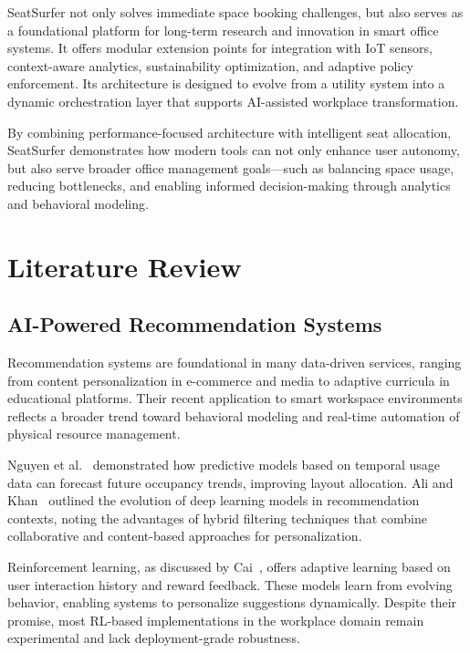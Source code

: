 \documentclass[onecolumn, 12pt]{IEEEtran}
\begin{document}
SeatSurfer not only solves immediate space booking challenges, but also serves as a foundational platform for long-term research and innovation in smart office systems. It offers modular extension points for integration with IoT sensors, context-aware analytics, sustainability optimization, and adaptive policy enforcement. Its architecture is designed to evolve from a utility system into a dynamic orchestration layer that supports AI-assisted workplace transformation.

By combining performance-focused architecture with intelligent seat allocation, SeatSurfer demonstrates how modern tools can not only enhance user autonomy, but also serve broader office management goals—such as balancing space usage, reducing bottlenecks, and enabling informed decision-making through analytics and behavioral modeling.

\section{Literature Review}

\subsection{AI-Powered Recommendation Systems}

Recommendation systems are foundational in many data-driven services, ranging from content personalization in e-commerce and media to adaptive curricula in educational platforms. Their recent application to smart workspace environments reflects a broader trend toward behavioral modeling and real-time automation of physical resource management.

Nguyen et al.~\cite{nguyen2023predictive} demonstrated how predictive models based on temporal usage data can forecast future occupancy trends, improving layout allocation. Ali and Khan~\cite{ali2023survey} outlined the evolution of deep learning models in recommendation contexts, noting the advantages of hybrid filtering techniques that combine collaborative and content-based approaches for personalization.

Reinforcement learning, as discussed by Cai~\cite{cai2022rl}, offers adaptive learning based on user interaction history and reward feedback. These models learn from evolving behavior, enabling systems to personalize suggestions dynamically. Despite their promise, most RL-based implementations in the workplace domain remain experimental and lack deployment-grade robustness.
\end{document}
